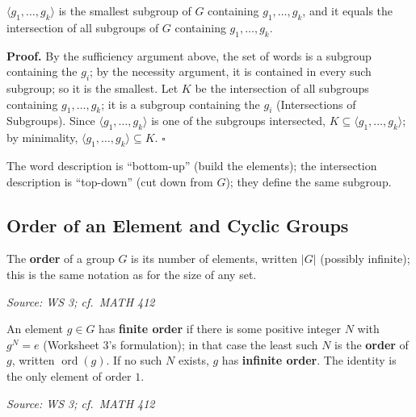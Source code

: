 \documentclass[11pt]{report}
\renewenvironment{proof}[1][Proof]{\noindent\textbf{#1.} }{\hfill$\square$\par\vspace{5pt}}
\newcommand{\srcline}[1]{\par\hfill{\footnotesize\textit{Source: #1}}}
\begin{document}
\begin{propbox}\label{prop:top-down-characterization-gen-g1-gk}
$\langle g_1, \ldots, g_k \rangle$ is the smallest subgroup of $G$ containing $g_1, \ldots, g_k$, and it equals the intersection of all subgroups of $G$ containing $g_1, \ldots, g_k$.
\end{propbox}

\begin{proof}
By the sufficiency argument above, the set of words is a subgroup containing the $g_i$; by the necessity argument, it is contained in every such subgroup; so it is the smallest. Let $K$ be the intersection of all subgroups containing $g_1, \ldots, g_k$; it is a subgroup containing the $g_i$ (Intersections of Subgroups). Since $\langle g_1, \ldots, g_k \rangle$ is one of the subgroups intersected, $K \subseteq \langle g_1, \ldots, g_k \rangle$; by minimality, $\langle g_1, \ldots, g_k \rangle \subseteq K$.
\end{proof}

\begin{rembox}\label{rem:bottom-up-versus-top-down}
The word description is ``bottom-up'' (build the elements); the intersection description is ``top-down'' (cut down from $G$); they define the same subgroup.
\end{rembox}

\subsection{Order of an Element and Cyclic Groups}\label{sec:order}

\begin{defbox}\label{def:order-group-order-element-cyclic-groups}
The \textbf{order} of a group $G$ is its number of elements, written $|G|$ (possibly infinite); this is the same notation as for the size of any set.
\srcline{WS 3; cf.\ MATH 412}
\end{defbox}

\begin{defbox}\label{def:order-element}
An element $g \in G$ has \textbf{finite order} if there is some positive integer $N$ with $g^N = e$ (Worksheet 3's formulation); in that case the least such $N$ is the \textbf{order} of $g$, written $\operatorname{ord}(g)$. If no such $N$ exists, $g$ has \textbf{infinite order}. The identity is the only element of order $1$.
\srcline{WS 3; cf.\ MATH 412}
\end{defbox}
\end{document}
